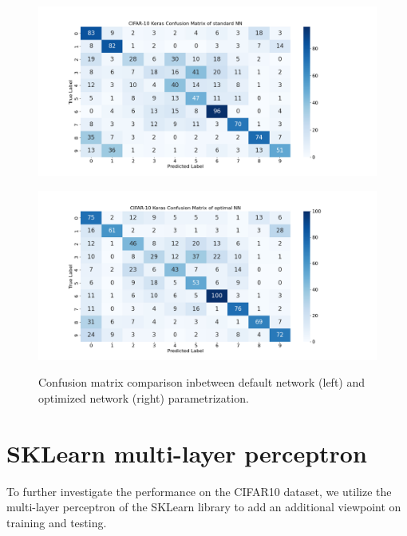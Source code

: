 \begin{figure}[H]
    \centering
    \begin{minipage}{.5\textwidth}
      \centering
      \includegraphics[width=1.25\linewidth]{img/ConfusionMatrix_standard.png}
      \label{fig:confusion_matrix_standard}
    \end{minipage}%
    \begin{minipage}{.5\textwidth}
      \centering
      \includegraphics[width=1.25\linewidth]{img/ConfusionMatrix_optimal.png}
      \label{fig:confusion_matrix_optimal}
    \end{minipage}
    \caption{Confusion matrix comparison inbetween default network (left) and optimized network (right) parametrization.}
    \label{fig:confusion_matrix_overview}
\end{figure}

\section{SKLearn multi-layer perceptron}
To further investigate the performance on the CIFAR10 dataset, we utilize the multi-layer perceptron of the SKLearn library to add an additional viewpoint on training and testing.



